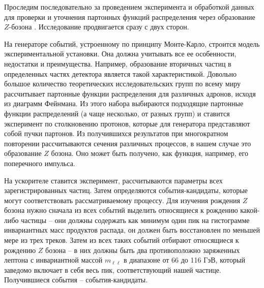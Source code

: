 \documentclass[12pt, a4paper]{article}
\begin{document}
Проследим последовательно за проведением эксперимента и обработкой данных для проверки и уточнения партонных функций распределения через образование $Z$-бозона \cite{render}. Исследование продвигается сразу с двух сторон.

На генераторе событий, устроенному по принципу Монте-Карло, строится модель экспериментальной установки. Она должна учитывать все ее особенности, недостатки и преимущества. Например, образование вторичных частиц в определенных частях детектора является такой характеристикой.
Довольно большое количество теоретических исследовательских групп по всему миру рассчитывает партонные функции распределения для различных адронов, исходя из диаграмм Фейнмана. 
Из этого набора выбираются подходящие партонные функции распределений (а чаще несколько, от разных групп) и ставится эксперимент по столкновению протонов, которые для генератора представляют собой пучки партонов. Из получившихся результатов при многократном повторении рассчитываются сечения различных процессов, в нашем случае это образование $Z$ бозона. Оно может быть получено, как функция, например, его поперечного импульса.

На ускорителе ставится эксперимент, рассчитываются параметры всех зарегистрированных частиц. Затем определяются события-кандидаты, которые могут соответствовать рассматриваемому процессу. Для изучения рождения $Z$ бозона нужно сначала из всех событий выделить относящиеся к рождению какой-либо частицы -- они должны содержать как минимум один пик на гистограмме инвариантных масс продуктов распада, он должен быть восстановлен по меньшей мере из трех треков. Затем из всех таких событий отбирают относящиеся к рождению $Z$ бозона -- в них должны быть два противоположно заряженных лептона с инвариантной массой $m_{\ell\ell}$ в диапазоне от 66 до 116 ГэВ, который заведомо включает в себя весь пик, соответствующий нашей частице. Получившиеся события -- события-кандидаты. 
%
\end{document}
